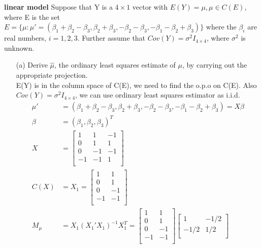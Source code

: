 \documentclass{article}
\begin{document}
\exercise
\textbf{linear model} Suppose that Y is a $4 \times 1$ vector with $E(Y ) = \mu, \mu \in C(E)$, where E is the set $E = \{ \mu: \mu' = (\beta_1 + \beta_2 - \beta_3, \beta_2 + \beta_3, -\beta_2 - \beta_3, -\beta_1-\beta_2 + \beta_3) \} $ where the $\beta_i$ are real numbers, $i = 1, 2, 3$. Further assume that $Cov(Y) = \sigma^2I_{4 \times 4}$, where $\sigma^2$ is unknown.\\
\begin{itemize}
    \item [(a)] Derive $\hat\mu$, the ordinary least squares estimate of $\mu$, by carrying out the
appropriate projection.\\
E(Y) is in the column space of C(E), we need to find the o.p.o on C(E). Also $Cov(Y) = \sigma^2 I_{4 \times 4}$, we can use ordinary least squares estimator as i.i.d.
\begin{align*}
    \mu' &= (\beta_1 + \beta_2 - \beta_3, \beta_2 + \beta_3, -\beta_2 - \beta_3, -\beta_1-\beta_2 + \beta_3) = X \beta\\
    \beta &= (\beta_1, \beta_2, \beta_3)^T\\
    X &= \begin{bmatrix}
           1  & 1 & -1  \\
           0 &  1 & 1\\
           0  & -1 & -1  \\
           -1 &  -1 & 1\\
         \end{bmatrix}\\
    C(X) &= X_1 = \begin{bmatrix}
           1  & 1   \\
           0 &  1 \\
           0  & -1  \\
           -1 &  -1 \\
         \end{bmatrix}\\
    M_{\mu} &= X_1(X_1'X_{1})^{-1} X_{1}^T = \begin{bmatrix}
           1  & 1   \\
           0 &  1 \\
           0  & -1  \\
           -1 &  -1 \\
         \end{bmatrix}\begin{bmatrix}
           1  & -1/2   \\
           -1/2 &  1/2 \\

\end{bmatrix}
\end{align*}
\end{itemize}
\end{document}
